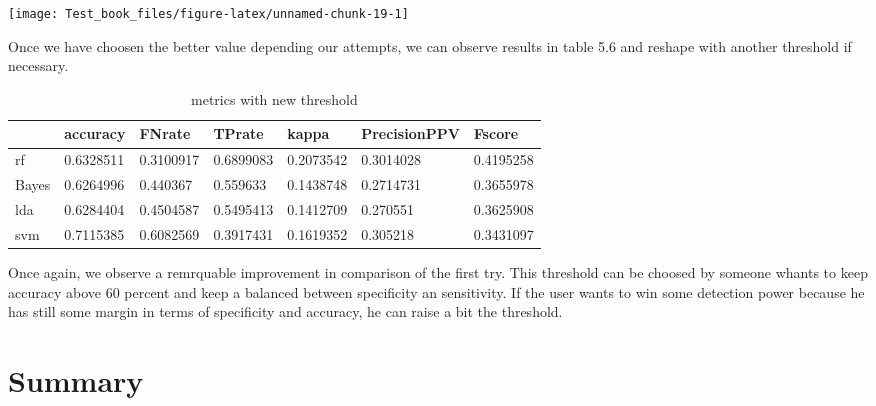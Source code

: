 \documentclass[
]{report}
\begin{document}
\begin{center}\texttt{[image: Test\_book\_files/figure-latex/unnamed-chunk-19-1]} \end{center}

Once we have choosen the better value depending our attempts, we can observe results in table 5.6 and reshape with another threshold if necessary.

\begin{table}

\caption{\label{tab:unnamed-chunk-20}metrics with new threshold}
\centering
\begin{tabular}[t]{l|l|l|l|l|l|l}
\hline
  & accuracy & FNrate & TPrate & kappa & PrecisionPPV & Fscore\\
\hline
rf & 0.6328511 & 0.3100917 & 0.6899083 & 0.2073542 & 0.3014028 & 0.4195258\\
\hline
Bayes & 0.6264996 & 0.440367 & 0.559633 & 0.1438748 & 0.2714731 & 0.3655978\\
\hline
lda & 0.6284404 & 0.4504587 & 0.5495413 & 0.1412709 & 0.270551 & 0.3625908\\
\hline
svm & 0.7115385 & 0.6082569 & 0.3917431 & 0.1619352 & 0.305218 & 0.3431097\\
\hline
\end{tabular}
\end{table}

Once again, we observe a remrquable improvement in comparison of the first try. This threshold can be choosed by someone whants to keep accuracy above 60 percent and keep a balanced between specificity an sensitivity. If the user wants to win some detection power because he has still some margin in terms of specificity and accuracy, he can raise a bit the threshold.

\hypertarget{summary}{%
\chapter{Summary}\label{summary}}
\end{document}
